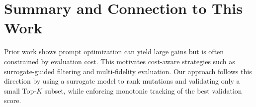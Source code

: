\section{Summary and Connection to This Work}
Prior work shows prompt optimization can yield large gains but is often constrained by evaluation cost. This motivates cost-aware strategies such as surrogate-guided filtering and multi-fidelity evaluation. Our approach follows this direction by using a surrogate model to rank mutations and validating only a small Top-$K$ subset, while enforcing monotonic tracking of the best validation score.